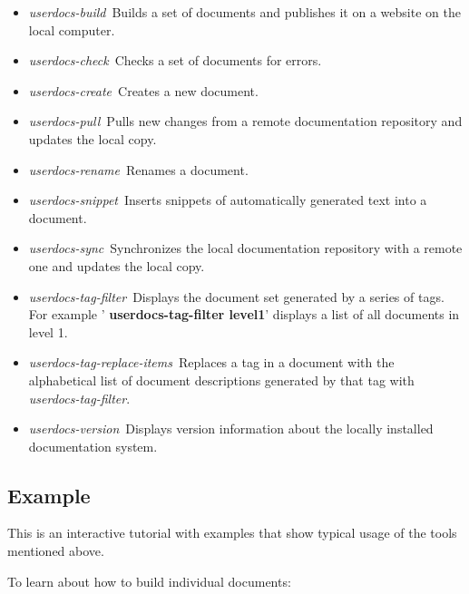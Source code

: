 \documentclass[12pt]{article}
\begin{document}
\begin{itemize}
\item {\it userdocs-build}\,\,\,Builds a set of documents and
  publishes it on a website on the local computer.
\item {\it userdocs-check}\,\,\,Checks a set of documents for errors.
\item {\it userdocs-create}\,\,\,Creates a new document.
\item {\it userdocs-pull}\,\,\,Pulls new changes from a remote
  documentation repository and updates the local copy.
\item {\it userdocs-rename}\,\,\,Renames a document.
\item {\it userdocs-snippet}\,\,\,Inserts snippets of automatically
  generated text into a document.
\item {\it userdocs-sync}\,\,\,Synchronizes the local documentation
  repository with a remote one and updates the local copy.
\item {\it userdocs-tag-filter}\,\,\,Displays the document set
  generated by a series of tags.  For example '{\bf
    userdocs-tag-filter level1}' displays a list of all documents in
  level 1.
\item {\it userdocs-tag-replace-items}\,\,\,Replaces a tag in a
  document with the alphabetical list of document descriptions
  generated by that tag with {\it userdocs-tag-filter}.
\item {\it userdocs-version}\,\,\,Displays version information about
  the locally installed documentation system.
\end{itemize}


\subsection*{Example}

This is an interactive tutorial with examples that show typical usage
of the tools mentioned above.

To learn about how to build individual documents:
\end{document}
